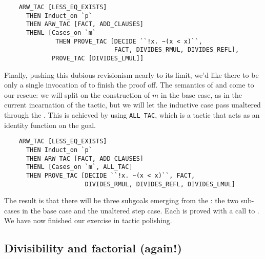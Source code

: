 {\small\begin{verbatim}
    ARW_TAC [LESS_EQ_EXISTS]
      THEN Induct_on `p`
      THEN ARW_TAC [FACT, ADD_CLAUSES]
      THENL [Cases_on `m`
              THEN PROVE_TAC [DECIDE ``!x. ~(x < x)``,
                              FACT, DIVIDES_RMUL, DIVIDES_REFL],
             PROVE_TAC [DIVIDES_LMUL]]
\end{verbatim}}

\noindent
Finally, pushing this dubious revisionism nearly to its limit, we'd
like there to be only a single invocation of  to finish
the proof off. The semantics of  and  come to
our rescue: we will split on the construction of $m$ in the base case,
as in the current incarnation of the tactic, but we will let the
inductive case pass unaltered through the . This is achieved
by using \verb+ALL_TAC+, which is a tactic that acts as an identity
function on the goal.
{\small\begin{verbatim}
    ARW_TAC [LESS_EQ_EXISTS]
      THEN Induct_on `p`
      THEN ARW_TAC [FACT, ADD_CLAUSES]
      THENL [Cases_on `m`, ALL_TAC]
      THEN PROVE_TAC [DECIDE ``!x. ~(x < x)``, FACT,
                      DIVIDES_RMUL, DIVIDES_REFL, DIVIDES_LMUL]
\end{verbatim}}

\noindent
The result is that there will be three subgoals emerging from the
: the two sub-cases in the base case and the unaltered step
case. Each is proved with a call to . We have now
finished our exercise in tactic polishing.

\subsection{Divisibility and factorial (again!)}

